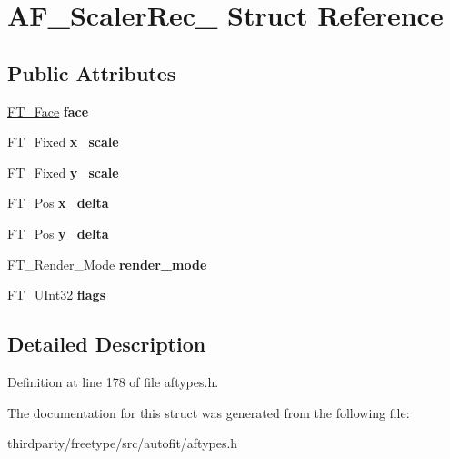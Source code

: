 \hypertarget{struct_a_f___scaler_rec__}{}\section{A\+F\+\_\+\+Scaler\+Rec\+\_\+ Struct Reference}
\label{struct_a_f___scaler_rec__}
\subsection*{Public Attributes}
\begin{DoxyCompactItemize}
\item 
\mbox{\label{struct_a_f___scaler_rec___a71f2b3394cdec1497970e082299cedf8}} 
\hyperlink{struct_f_t___face_rec__}{F\+T\+\_\+\+Face} {\bfseries face}
\item 
\mbox{\label{struct_a_f___scaler_rec___acc8f40b57f6c142801cae42ab2304c6b}} 
F\+T\+\_\+\+Fixed {\bfseries x\+\_\+scale}
\item 
\mbox{\label{struct_a_f___scaler_rec___aa5074c2d767b7b2b88cce17170804a17}} 
F\+T\+\_\+\+Fixed {\bfseries y\+\_\+scale}
\item 
\mbox{\label{struct_a_f___scaler_rec___a806f45a9ef06653df58974f5c180b447}} 
F\+T\+\_\+\+Pos {\bfseries x\+\_\+delta}
\item 
\mbox{\label{struct_a_f___scaler_rec___a4268e4713bf34c85bbb004867f6a421d}} 
F\+T\+\_\+\+Pos {\bfseries y\+\_\+delta}
\item 
\mbox{\label{struct_a_f___scaler_rec___a16a5cb8f74254cae911565d3aa35472e}} 
F\+T\+\_\+\+Render\+\_\+\+Mode {\bfseries render\+\_\+mode}
\item 
\mbox{\label{struct_a_f___scaler_rec___a054820659ad76b27637a6e0b214b1ec5}} 
F\+T\+\_\+\+U\+Int32 {\bfseries flags}
\end{DoxyCompactItemize}


\subsection{Detailed Description}


Definition at line 178 of file aftypes.\+h.



The documentation for this struct was generated from the following file\+:\begin{DoxyCompactItemize}
\item 
thirdparty/freetype/src/autofit/aftypes.\+h\end{DoxyCompactItemize}
